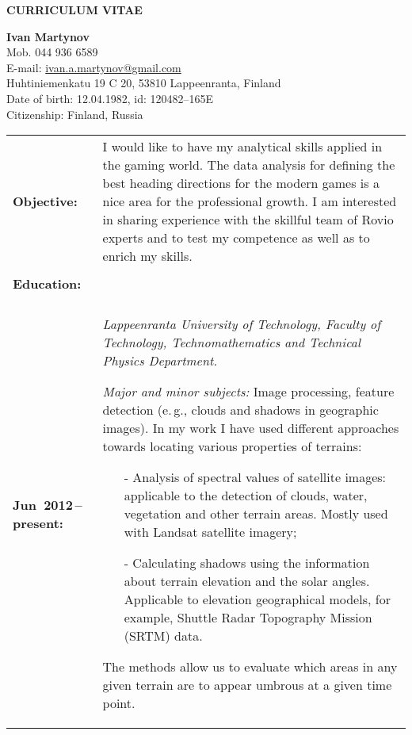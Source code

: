 \documentclass[a4paper]{article}
\begin{document}
\begin{center}
\Large{\bf{CURRICULUM VITAE}}
\end{center}

\begin{flushleft}
\textbf{Ivan Martynov}\\
Mob. 044 936 6589\\
E-mail: \href{ivan.a.martynov@gmail.com}{ivan.a.martynov@gmail.com}\\
Huhtiniemenkatu 19 C 20, 53810 Lappeenranta, Finland\\
Date of birth: 12.04.1982, id: 120482--165E\\
Citizenship: Finland, Russia
\end{flushleft}
\vspace{-10pt}

\begin{longtable}{p{} p{}}
  \textbf{Objective:} &
  I would like to have my analytical skills applied in the gaming world. The
  data analysis for defining the best heading directions for the modern games
  is a nice area for the professional growth. I am interested in sharing
  experience with the skillful team of Rovio experts and to test my competence
  as well as to enrich my skills.
\\
& \\
\multicolumn{2}{l}{\cellcolor{myGray}\textbf{Education:}}\\
& \\

\textbf{Jun~2012\,--\,present:} &
  \textmd{\textsl{Lappeenranta University of Technology, Faculty of Technology,
    Technomathematics and Technical Physics Department.}}

  \textit{Major and minor subjects:} Image processing, feature detection
  (e.\,g., clouds and shadows in geographic images). In my work I have used
  different approaches towards locating various properties of terrains:
  \vspace{-10pt}
  \begin{itemize}
    \setlength\itemsep{-3pt}
    \item[-]Analysis of spectral values of satellite images: applicable to
      the detection of clouds, water, vegetation and other terrain areas. Mostly
      used with Landsat satellite imagery;
    \item[-]Calculating shadows using the information about terrain elevation and
      the solar angles. Applicable to elevation geographical models, for
      example, Shuttle Radar Topography Mission (SRTM) data.
  \end{itemize}
  \vspace{-10pt}
  The methods allow us to evaluate which areas in any given terrain are to
  appear umbrous at a given time point.


\end{longtable}
\end{document}
